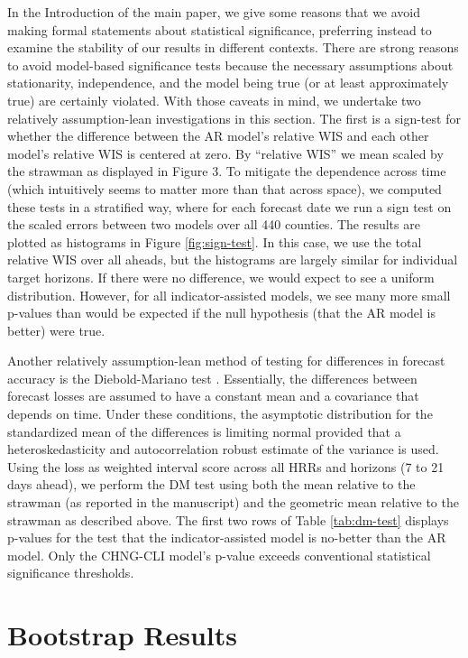 In the Introduction of the main paper, we give some reasons that we avoid making
formal statements about statistical significance, preferring instead to examine
the stability of our results in different contexts. There are strong reasons to
avoid model-based significance tests because the necessary assumptions about
stationarity, independence, and the  model being true (or at least approximately
true) are certainly violated. With those caveats in mind, we undertake two
relatively assumption-lean investigations in this section. The first is a
sign-test for whether the difference between the AR model’s relative WIS  and
each other model’s relative WIS is centered at zero. By ``relative WIS'' we mean
scaled by the strawman as displayed in Figure 3. To mitigate the dependence
across time (which intuitively seems to matter more than that across space), we
computed these tests in a stratified way, where for each forecast date we run a
sign test on the scaled errors between two models over all 440 counties. The
results are plotted as histograms in Figure \ref{fig:sign-test}. In this case,
we use the total relative WIS over all aheads, but the histograms are largely
similar for individual target horizons. If there were no difference, we would
expect to see a uniform distribution. However, for all indicator-assisted
models, we see many more small p-values than would be expected if the null
hypothesis (that the AR model is better) were true.

Another relatively assumption-lean method of testing for differences in forecast
accuracy is the Diebold-Mariano test \cite{Diebold:2002, Diebold:2015,
Harvey:1997}. Essentially, the differences between forecast losses are assumed
to have a constant mean and a covariance that depends on time. Under these
conditions, the asymptotic distribution for the standardized mean of the
differences is limiting normal provided that a heteroskedasticity and
autocorrelation robust estimate of the variance is used. Using the loss as
weighted interval score across all HRRs and horizons (7 to 21 days ahead), we
perform the DM test using both the mean relative to the strawman (as reported in
the manuscript) and the geometric mean relative to the strawman as described
above. The first two rows of Table \ref{tab:dm-test} displays p-values for the
test that the indicator-assisted model is no-better than the AR model. Only the
CHNG-CLI model's p-value exceeds conventional statistical significance
thresholds.

\section{Bootstrap Results}

